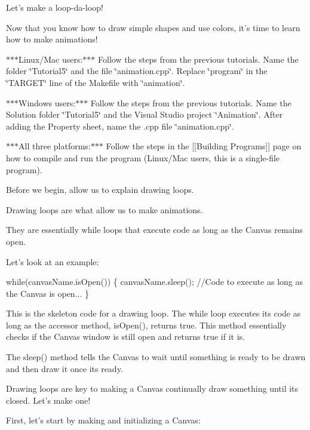 Let's make a loop-\/da-\/loop!

Now that you know how to draw simple shapes and use colors, it's time to learn how to make animations!

$\ast$$\ast$$\ast$\-Linux/\-Mac users\-:$\ast$$\ast$$\ast$ Follow the steps from the previous tutorials. Name the folder \char`\"{}\-Tutorial5\char`\"{} and the file \char`\"{}animation.\-cpp\char`\"{}. Replace \char`\"{}program\char`\"{} in the \char`\"{}\-T\-A\-R\-G\-E\-T\char`\"{} line of the Makefile with \char`\"{}animation\char`\"{}.

$\ast$$\ast$$\ast$\-Windows users\-:$\ast$$\ast$$\ast$ Follow the steps from the previous tutorials. Name the Solution folder \char`\"{}\-Tutorial5\char`\"{} and the Visual Studio project \char`\"{}\-Animation\char`\"{}. After adding the Property sheet, name the .cpp file \char`\"{}animation.\-cpp\char`\"{}.

$\ast$$\ast$$\ast$\-All three platforms\-:$\ast$$\ast$$\ast$ Follow the steps in the \mbox{[}\mbox{[}Building Programs\mbox{]}\mbox{]} page on how to compile and run the program (Linux/\-Mac users, this is a single-\/file program).

Before we begin, allow us to explain drawing loops.

Drawing loops are what allow us to make animations.

They are essentially while loops that execute code as long as the Canvas remains open.

Let's look at an example\-:


\begin{DoxyCode}
\textcolor{keywordflow}{while}(canvasName.isOpen()) \{
   canvasName.sleep();
  \textcolor{comment}{//Code to execute as long as the Canvas is open...}
\}
\end{DoxyCode}


This is the skeleton code for a drawing loop. The while loop executes its code as long as the accessor method, {\ttfamily is\-Open()}, returns {\ttfamily true}. This method essentially checks if the Canvas window is still open and returns {\ttfamily true} if it is.

The {\ttfamily sleep()} method tells the Canvas to wait until something is ready to be drawn and then draw it once its ready.

Drawing loops are key to making a Canvas continually draw something until its closed. Let's make one!

First, let's start by making and initializing a Canvas\-:


